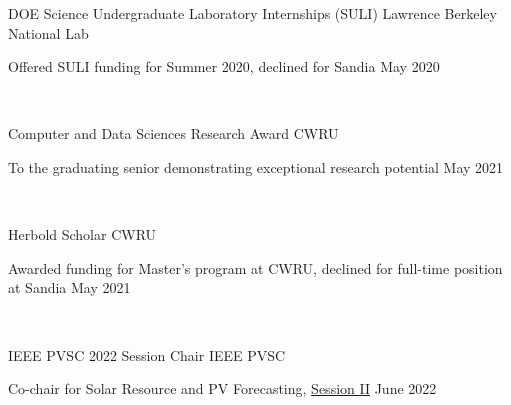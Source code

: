 \documentclass[10pt]{article}
\begin{document}
 {
	
{ 
	DOE Science Undergraduate Laboratory Internships (SULI)} 
\hspace*{0pt}\hfill Lawrence Berkeley National Lab

Offered SULI funding for Summer 2020, declined for Sandia \hspace*{0pt}\hfill May 2020

\

%
%
{ 
Computer and Data Sciences Research Award} 
\hspace*{0pt}\hfill CWRU 

To the graduating senior demonstrating exceptional research potential \hspace*{0pt}\hfill May 2021

\

{ 
Herbold Scholar} 
\hspace*{0pt}\hfill CWRU 

Awarded funding for Master's program at CWRU, declined for full-time position at Sandia \hspace*{0pt}\hfill May 2021

\

{ 
IEEE PVSC 2022 Session Chair} 
\hspace*{0pt}\hfill IEEE PVSC 

Co-chair for Solar Resource and PV Forecasting,  \href{https://ieee-pvsc.org/PVSC49/program-full.php?page=program&displayday=6&pads=&start_range=&start_interval=&changing_days=yes&hide_details=}{Session II} \hspace*{0pt}\hfill June 2022

\
%
%


}
\end{document}
